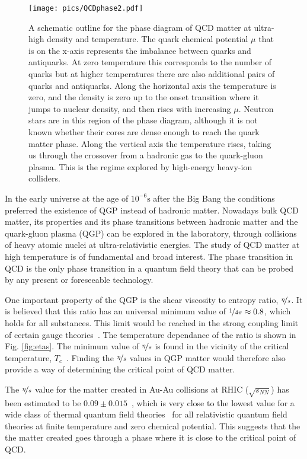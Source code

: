 \begin{figure}[htbp]
\centering
\texttt{[image: pics/QCDphase2.pdf]}
\caption[QCD phase diagram]{A schematic outline for the phase diagram of QCD matter at ultra-high density and temperature. The quark chemical potential $\mu$ that is on the x-axis represents the imbalance between quarks and antiquarks. At zero temperature this corresponds to the number of quarks but at higher temperatures there are also additional pairs of quarks and antiquarks. Along the horizontal axis the temperature is zero, and the density is zero up to the onset transition where it jumps to nuclear density, and then rises with increasing $\mu$.  Neutron stars are in this region of the phase diagram, although it is not known whether their cores are dense enough to reach the quark matter phase. Along the vertical axis the temperature rises, taking us through the crossover from a hadronic gas to the quark-gluon plasma. This is the regime explored by high-energy heavy-ion colliders.~\cite{Rajagopal:2001}}
\label{fig:QCDphase}
\end{figure}


In the early universe at the age of $10^{-6}\mathrm{s}$ after the Big Bang the conditions preferred the existence of QGP instead of hadronic matter. Nowadays bulk QCD matter, its properties and its phase transitions between hadronic matter and the quark-gluon plasma (QGP) can be explored in the laboratory, through collisions of heavy atomic nuclei at ultra-relativistic energies. The study of QCD matter at high temperature is of fundamental and broad interest. The phase transition in QCD is the only phase transition in a quantum field theory that can be probed by any present or foreseeable technology. 

One important property of the QGP is the shear viscosity to entropy ratio, $\nicefrac{\eta}{s}$. It is believed that this ratio has an universal minimum value of $\nicefrac{1}{4\pi}\approx 0.8$, which holds for all substances. This limit would be reached in the strong coupling limit of certain gauge theories~\cite{Kovtun:2004de}. The temperature dependance of the ratio is shown in Fig. \ref{fig:etas}. The minimum value of $\nicefrac{\eta}{s}$ is found in the vicinity of the critical temperature, $T_c$~\cite{PhysRevLett.98.092301}. Finding the $\nicefrac{\eta}{s}$ values in QGP matter would therefore also provide a way of determining the critical point of QCD matter.

The $\nicefrac{\eta}{s}$ value for the matter created in Au-Au collisions at RHIC ($\sqrt{s_{NN}}$)  has been estimated to be $0.09\pm0.015$~\cite{PhysRevLett.98.092301}, which is very close to the lowest value for a wide class of thermal quantum field theories~\cite{Kovtun:2004de} for all relativistic quantum field theories at finite temperature and zero chemical potential. This suggests that the the matter created goes through a phase where it is close to the critical point of QCD.

